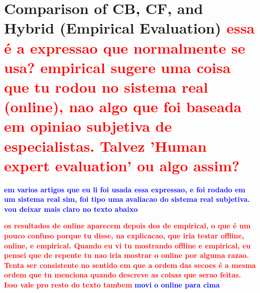 \documentclass[cic,tc,english]{iiufrgs}
\newcommand{\bruno}[1]{\textcolor{red}{\textbf{#1}}}
\newcommand{\adriano}[1]{\textcolor{blue}{\textbf{#1}}}
\begin{document}
\section{Comparison of CB, CF, and Hybrid (Empirical Evaluation) \bruno{essa é a expressao que normalmente se usa? empirical sugere uma coisa que tu rodou no sistema real (online), nao algo que foi baseada em opiniao subjetiva de especialistas. Talvez 'Human expert evaluation' ou algo assim?}} \adriano{em varios artigos que eu li foi usada essa expressao, e foi rodado em um sistema real sim, foi tipo uma avaliacao do sistema real subjetiva. vou deixar mais claro no texto abaixo} \label{empirical-evaluation}

\bruno{os resultados de online aparecem depois dos de empirical, o que é um pouco confuso porque tu disse, na explicacao, que iria testar offline, online, e empirical. Quando eu vi tu mostrando offline e empirical, eu pensei que de repente tu nao iria mostrar o online por alguma razao. Tenta ser consistente no sentido em que a ordem das secoes é a mesma ordem que tu menciona quando descreve as coisas que serao feitas. Isso vale pro resto do texto tambem} \adriano{movi o online para cima}
\end{document}

